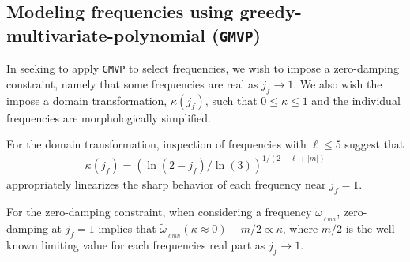 \documentclass[twocolumn,aps,prd,floatfix,preprintnumbers,a4paper,nofootinbib,
superscriptaddress,10pt]{revtex4-1}
\newcommand{\cw}{\tilde{\omega}}
\def\jf{j_f}
\def\lmn{_{\ell m n}}
\def\gmvp#1{greedy-multivariate-polynomial#1
  (\texttt{GMVP}#1)\gdef\gmvp{\texttt{GMVP}}}
\begin{document}
\subsection{Modeling \qnm{} frequencies using \gmvp{}}
%
In seeking to apply \gmvp{} to select \qnm{} frequencies, we wish to impose a zero-damping constraint, namely that some frequencies are real as $\jf \rightarrow 1$.
%
We also wish the impose a domain transformation, $\kappa(\jf)$, such that $0 \leq \kappa \leq 1$ and the individual \qnm{} frequencies are morphologically simplified.
%
\par For the domain transformation, inspection of \qnm{} frequencies with $\ell \leq 5$ suggest that
%
\begin{align}
  \kappa(\jf) = \left( \ln( 2 - \jf ) / \ln(3) \right)^{1/(2-\ell+|m|)}
\end{align}
%
appropriately linearizes the sharp behavior of each frequency near $\jf=1$.
%
\par For the zero-damping constraint, when considering a \qnm{} frequency $\cw_{\lmn}$, zero-damping at $\jf=1$ implies that $\cw_{\lmn}(\kappa \approx 0)-m/2 \propto \kappa$, where $m/2$ is the well known limiting value for each \qnm{} frequencies real part as $\jf\rightarrow 1$.
%
\end{document}
